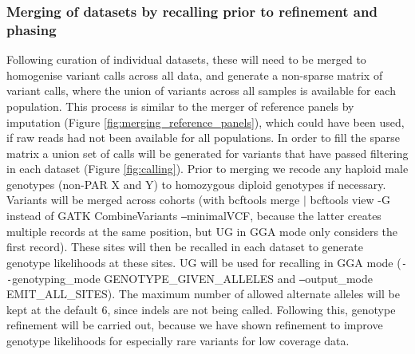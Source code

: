 \subsubsection{Merging of datasets by recalling prior to refinement and phasing}
Following curation of individual datasets, these will need to be merged to homogenise variant calls across all data, and generate a non-sparse matrix of variant calls, where the union of variants across all samples is available for each population. This process is similar to the merger of reference panels by imputation (Figure \ref{fig:merging_reference_panels}), which could have been used, if raw reads had not been available for all populations. In order to fill the sparse matrix a union set of calls will be generated for variants that have passed filtering in each dataset (Figure \ref{fig:calling}). Prior to merging we recode any haploid male genotypes (non-PAR X and Y) to homozygous diploid genotypes if necessary. %
Variants will be merged across cohorts (with bcftools merge $|$ bcftools view -G instead of GATK CombineVariants \texttt{--}minimalVCF, because the latter creates multiple records at the same position, but UG in GGA mode only considers the first record).
These sites will then be recalled in each dataset to generate genotype likelihoods at these sites.
\gls{UG} will be used for recalling in GGA mode (\texttt{-{}-}genotyping\_mode GENOTYPE\_GIVEN\_ALLELES and \texttt{--}output\_mode EMIT\_ALL\_SITES).
The maximum number of allowed alternate alleles will be kept at the default 6, since indels are not being called. %
Following this, genotype refinement will be carried out, because we have shown refinement to improve genotype likelihoods for especially rare variants for low coverage data\cite{Gurdasani2015}.

